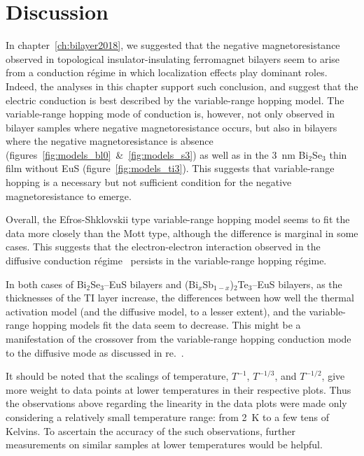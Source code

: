 \section{Discussion}
In chapter~\ref{ch:bilayer2018}, we suggested that the negative magnetoresistance observed in topological insulator-insulating ferromagnet bilayers seem to arise from a conduction r\'egime in which localization effects play dominant roles. Indeed, the analyses in this chapter support such conclusion, and suggest that the electric conduction is best described by the variable-range hopping model. The variable-range hopping mode of conduction is, however, not only observed in bilayer samples where negative magnetoresistance occurs, but also in bilayers where the negative magnetoresistance is absence (figures~\ref{fig:models_bl0}~\&~\ref{fig:models_s3}) as well as in the \SI{3}{nm} Bi$_2$Se$_3$ thin film without EuS (figure~\ref{fig:models_ti3}). This suggests that variable-range hopping is a necessary but not sufficient condition for the negative magnetoresistance to emerge.

Overall, the Efros-Shklovskii type variable-range hopping model seems to fit the data more closely than the Mott type, although the difference is marginal in some cases. This suggests that the electron-electron interaction observed in the diffusive conduction r\'egime~\cite{Chen2011, Liu2011, Roy2013} persists in the variable-range hopping r\'egime.

In both cases of Bi$_2$Se$_3$--EuS bilayers and (Bi$_x$Sb$_{1-x}$)$_2$Te$_3$--EuS bilayers, as the thicknesses of the TI layer increase, the differences between how well the thermal activation model (and the diffusive model, to a lesser extent), and the variable-range hopping models fit the data seem to decrease. This might be a manifestation of the crossover from the variable-range hopping conduction mode to the diffusive mode as discussed in re.~\cite{liao2015}.

It should be noted that the scalings of temperature, $T^{-1}$, $T^{-1/3}$, and $T^{-1/2}$, give more weight to data points at lower temperatures in their respective plots. Thus the observations above regarding the linearity in the data plots were made only considering a relatively small temperature range: from \SI{2}{K} to a few tens of Kelvins. To ascertain the accuracy of the such observations, further measurements on similar samples at lower temperatures would be helpful.